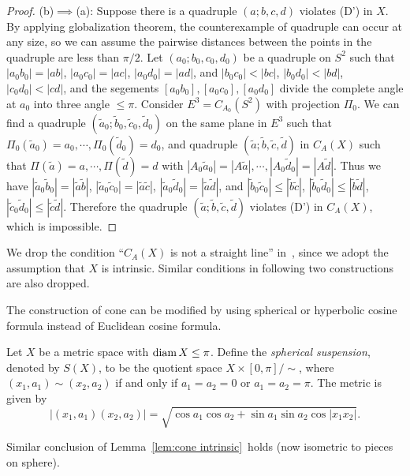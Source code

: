 \begin{proof}
    (b)$\implies$(a):
    Suppose there is a quadruple $(a;b,c,d)$ violates (D') in $X$.
    By applying globalization theorem, the counterexample of quadruple can occur at any size, so we can assume the pairwise distances between the points in the quadruple are less than $\pi/2$.
    Let $(a_0;b_0,c_0,d_0)$ be a quadruple on $S^2$ such that $|a_0b_0|=|ab|$, $|a_0c_0|=|ac|$, $|a_0d_0|=|ad|$, and $|b_0c_0|<|bc|$, $|b_0d_0|<|bd|$, $|c_0d_0|<|cd|$, and the segements $[a_0b_0],[a_0c_0],[a_0d_0]$ divide the complete angle at $a_0$ into three angle $\leq\pi$.
    Consider $E^3=C_{A_0}(S^2)$ with projection $\Pi_0$.
    We can find a quadruple $(\tilde{a}_0;\tilde{b}_0,\tilde{c}_0,\tilde{d}_0)$ on the same plane in $E^3$ such that $\Pi_0(\tilde{a}_0)=a_0,\cdots,\Pi_0(\tilde{d}_0)=d_0$, and quadruple $(\tilde{a};\tilde{b},\tilde{c},\tilde{d})$ in $C_A(X)$ such that $\Pi(\tilde{a})=a,\cdots,\Pi(\tilde{d})=d$ with $|A_0\tilde{a}_0|=|A\tilde{a}|,\cdots,|A_0\tilde{d}_0|=|A\tilde{d}|$.
    Thus we have $|\tilde{a}_0\tilde{b}_0|=|\tilde{a}\tilde{b}|$, $|\tilde{a}_0\tilde{c}_0|=|\tilde{a}\tilde{c}|$, $|\tilde{a}_0\tilde{d}_0|=|\tilde{a}\tilde{d}|$, and $|\tilde{b}_0\tilde{c}_0|\leq|\tilde{b}\tilde{c}|$, $|\tilde{b}_0\tilde{d}_0|\leq|\tilde{b}\tilde{d}|$, $|\tilde{c}_0\tilde{d}_0|\leq|\tilde{c}\tilde{d}|$.
    Therefore the quadruple $(\tilde{a};\tilde{b},\tilde{c},\tilde{d})$ violates (D') in $C_A(X)$, which is impossible.
\end{proof}

\begin{rem}
    We drop the condition ``$C_A(X)$ is not a straight line'' in~\cite{buragoADAlexandrovSpaces1992}, since we adopt the assumption that $X$ is intrinsic.
    Similar conditions in following two constructions are also dropped.
\end{rem}

The construction of cone can be modified by using spherical or hyperbolic cosine formula instead of Euclidean cosine formula.

\begin{defn}
    Let $X$ be a metric space with $\operatorname{diam}{X}\leq\pi$.
    Define the \emph{spherical suspension}, denoted by $S(X)$, to be the quotient space $X\times[0,\pi]/\sim$, where $(x_1,a_1)\sim(x_2,a_2)$ if and only if $a_1=a_2=0$ or $a_1=a_2=\pi$.
    The metric is given by
    \[|(x_1,a_1)(x_2,a_2)|=\sqrt{\cos{a_1}\cos{a_2}+\sin{a_1}\sin{a_2}\cos{|x_1x_2|}}.\]
\end{defn}

Similar conclusion of Lemma~\ref{lem:cone intrinsic}~holds (now isometric to pieces on sphere).

